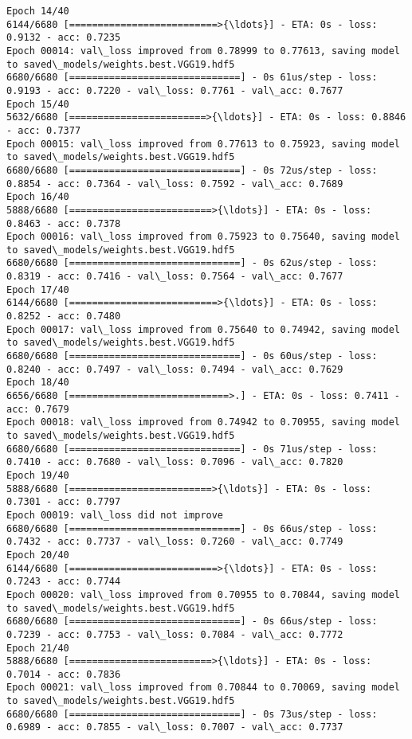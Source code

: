 \documentclass[11pt]{article}
\begin{document}
\begin{Verbatim}[commandchars=\\\{\}]
Epoch 14/40
6144/6680 [==========================>{\ldots}] - ETA: 0s - loss: 0.9132 - acc: 0.7235
Epoch 00014: val\_loss improved from 0.78999 to 0.77613, saving model to saved\_models/weights.best.VGG19.hdf5
6680/6680 [==============================] - 0s 61us/step - loss: 0.9193 - acc: 0.7220 - val\_loss: 0.7761 - val\_acc: 0.7677
Epoch 15/40
5632/6680 [========================>{\ldots}] - ETA: 0s - loss: 0.8846 - acc: 0.7377
Epoch 00015: val\_loss improved from 0.77613 to 0.75923, saving model to saved\_models/weights.best.VGG19.hdf5
6680/6680 [==============================] - 0s 72us/step - loss: 0.8854 - acc: 0.7364 - val\_loss: 0.7592 - val\_acc: 0.7689
Epoch 16/40
5888/6680 [=========================>{\ldots}] - ETA: 0s - loss: 0.8463 - acc: 0.7378
Epoch 00016: val\_loss improved from 0.75923 to 0.75640, saving model to saved\_models/weights.best.VGG19.hdf5
6680/6680 [==============================] - 0s 62us/step - loss: 0.8319 - acc: 0.7416 - val\_loss: 0.7564 - val\_acc: 0.7677
Epoch 17/40
6144/6680 [==========================>{\ldots}] - ETA: 0s - loss: 0.8252 - acc: 0.7480
Epoch 00017: val\_loss improved from 0.75640 to 0.74942, saving model to saved\_models/weights.best.VGG19.hdf5
6680/6680 [==============================] - 0s 60us/step - loss: 0.8240 - acc: 0.7497 - val\_loss: 0.7494 - val\_acc: 0.7629
Epoch 18/40
6656/6680 [============================>.] - ETA: 0s - loss: 0.7411 - acc: 0.7679
Epoch 00018: val\_loss improved from 0.74942 to 0.70955, saving model to saved\_models/weights.best.VGG19.hdf5
6680/6680 [==============================] - 0s 71us/step - loss: 0.7410 - acc: 0.7680 - val\_loss: 0.7096 - val\_acc: 0.7820
Epoch 19/40
5888/6680 [=========================>{\ldots}] - ETA: 0s - loss: 0.7301 - acc: 0.7797
Epoch 00019: val\_loss did not improve
6680/6680 [==============================] - 0s 66us/step - loss: 0.7432 - acc: 0.7737 - val\_loss: 0.7260 - val\_acc: 0.7749
Epoch 20/40
6144/6680 [==========================>{\ldots}] - ETA: 0s - loss: 0.7243 - acc: 0.7744
Epoch 00020: val\_loss improved from 0.70955 to 0.70844, saving model to saved\_models/weights.best.VGG19.hdf5
6680/6680 [==============================] - 0s 66us/step - loss: 0.7239 - acc: 0.7753 - val\_loss: 0.7084 - val\_acc: 0.7772
Epoch 21/40
5888/6680 [=========================>{\ldots}] - ETA: 0s - loss: 0.7014 - acc: 0.7836
Epoch 00021: val\_loss improved from 0.70844 to 0.70069, saving model to saved\_models/weights.best.VGG19.hdf5
6680/6680 [==============================] - 0s 73us/step - loss: 0.6989 - acc: 0.7855 - val\_loss: 0.7007 - val\_acc: 0.7737

\end{Verbatim}
\end{document}
